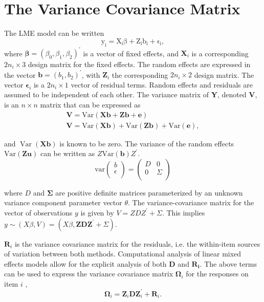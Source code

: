 \documentclass[12pt, a4paper]{report}
\theoremstyle{plain}
\theoremstyle{definition}
\theoremstyle{remark}
\begin{document}



\section{The Variance Covariance Matrix}
The LME model can be written
\[
\mathrm{y_{i}} = \mathrm{X_{i}\beta} + \mathrm{Z_{i}b_{i}} + \mathrm{\epsilon_{i}},
\]
where $\boldsymbol{\beta}=(\beta_0,\beta_1,\beta_2)^\prime$ is a vector of fixed effects, and $\boldsymbol{X}_i$ is a corresponding $2n_i\times 3$ design matrix for the fixed effects. The random effects are expressed in the vector $\boldsymbol{b}=(b_1,b_2)^\prime$, with $\boldsymbol{Z}_i$ the corresponding $2n_i\times 2$ design matrix. The vector $\boldsymbol{\epsilon}_i$ is a $2n_i\times 1$ vector of residual terms. Random effects and residuals are assumed to be independent of each other.
The variance matrix of \textbf{Y}, denoted \textbf{V}, is an $n \times n$ matrix that can be expressed
as 
\begin{eqnarray}
\textbf{V}= \textrm{Var} ( \textbf{Xb} + \textbf{Zb} + \textbf{e})\\
\textbf{V}= \textrm{Var} ( \textbf{Xb} ) + \textrm{Var} (\textbf{Zb}) +
\textrm{Var}(\textbf{e}),
\end{eqnarray}


and $\operatorname{Var}(\textbf{Xb})$ is known to be zero. The variance of the
random effects $\mbox{Var}(\textbf{Zu})$ can be written as
$Z\mbox{Var}(\textbf{b})Z^{\prime}$.
\[
\mathrm{var}
\left(
\begin{array}{c}
b \\
\epsilon \\
\end{array}
\right)
=
\left(
\begin{array}{cc}
D & 0 \\
0 & \Sigma \\
\end{array}
\right)
\]




where $D$ and $\boldsymbol{\Sigma}$ are positive definite matrices parameterized by an unknown variance component parameter vector $ \theta.$ The variance-covariance matrix for the vector of observations $y$ is given by $V = ZDZ^{\prime}+ \Sigma.$ This implies $y \sim(X\beta, V) = (X\beta, \boldsymbol{ZDZ}^{\prime}+ \Sigma)$. 

$\boldsymbol{R}_{i}$ is the variance covariance matrix for the residuals, i.e. the within-item sources of variation between both methods. Computational analysis of linear mixed effects models allow for the explicit analysis of both $\boldsymbol{D}$ and $\boldsymbol{R_i}$.
The above terms can be used to express the  variance covariance matrix $\boldsymbol{\Omega}_i$ for the responses on item $i$ ,
\[
\boldsymbol{\Omega}_i = \boldsymbol{Z}_i \boldsymbol{D} \boldsymbol{Z}_i^{\prime} + \boldsymbol{R}_i.
\]
\end{document}
